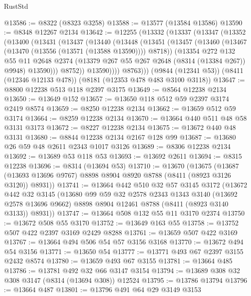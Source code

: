 \begin{lexlean}{RustStd}
\begin{coremodule}
@13586 := @8322 (@8323 @3258)
@13588 := @13577 (@13584 @13586)
@13590 := @8348 @12267 @2134
@13642 := @12255
    (@13332
      (@13337
        (@13347
          (@13352
            (@13400
              (@13431
                (@13437
                  (@13440
                    (@13448
                      (@13451
                        (@13457
                          (@13460 (@13467 (@13470 (@13556 (@13571 (@13588 @13590)))) @8718))
                          (@13354
                            @272
                            @132
                            @55
                            @11
                            @2648
                            @2374
                            (@13379 @267 @55 @267 @2648 (@8314 (@13384 @267)) @9948)
                            @13590)))
                      @8752))
                  @13590))))
          @8763)))
    (@9844 (@12341 @53))
    (@8411 (@12346 @12133 @478))
    (@8181 (@12353 @478 @483 @3100 @3118))
@13647 := @8800 @12238 @513 @118 @2397 @3175
@13649 := @8564 @12238 @2134
@13650 := @13649 @152
@13657 := @13650 @118 @512 @59 @2397 @3174 @2419 @8574
@13659 := @8250 @12238 @2134
@13662 := @13659 @512 @59 @3174
@13664 := @8259 @12238 @2134
@13670 := @13664 @440 @511 @48 @58 @3131 @3173
@13672 := @8227 @12238 @2134
@13675 := @13672 @440 @48 @3131
@13680 := @8844 @12238 @2134 @2167 @128 @99
@13687 := @13680 @26 @59 @48 @2611 @2343 @1017 @3126
@13689 := @8306 @12238 @2134
@13692 := @13689 @53 @118 @53
@13693 := @13692 @2611
@13694 := @8315 @12238
@13696 := @8314 (@13694 @53)
@13710 := @13670
    (@13675
      (@13687 (@13693 @13696 @9767) @8898 @8904 @8920 @8788 (@8411 (@8923 @3126 @3120)) @8931))
@13741 := @13664
    @442
    @510
    @32
    @57
    @3145
    @3172
    (@13672
      @442
      @32
      @3145
      (@13680
        @99
        @59
        @32
        @2578
        @2343
        @1343
        @3140
        (@13692 @2578 @13696 @9662)
        @8898
        @8904
        @12461
        @8788
        (@8411 (@8923 @3140 @3133))
        @8931))
@13747 := @13664 @508 @132 @55 @11 @3170 @2374
@13750 := @13672 @508 @55 @3170
@13752 := @13649 @163 @55
@13758 := @13752 @507 @422 @2397 @3169 @2429 @8288
@13761 := @13659 @507 @422 @3169
@13767 := @13664 @494 @506 @54 @57 @3156 @3168
@13770 := @13672 @494 @54 @3156
@13771 := @13650 @54
@13777 := @13771 @493 @67 @2397 @3155 @2432 @8574
@13780 := @13659 @493 @67 @3155
@13781 := @13664 @485
@13786 := @13781 @492 @32 @66 @3147 @3154
@13794 := @13689 @308 @32 @308 @3147 (@8314 (@13694 @308)) @12524
@13795 := @13786 @13794
@13796 := @13664 @487
@13801 := @13796 @491 @64 @29 @3149 @3153

\end{coremodule}
\end{lexlean}
